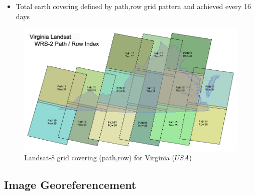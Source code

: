 \documentclass[c]{beamer}
\begin{document}
\begin{frame}
\begin{itemize}
\item Total earth covering defined by path,row grid pattern and achieved every 16 days
\end{itemize}
\begin{figure}
  \includegraphics[scale=0.13]{images/covering/wrs.png}
  \caption{Landsat-8 grid covering (path,row) for Virginia ($USA$) }
\end{figure}
\end{frame}

\subsection{Image Georeferencement}
\begin{frame}
\tableofcontents[currentsubsection]
\end{frame}
\end{document}

